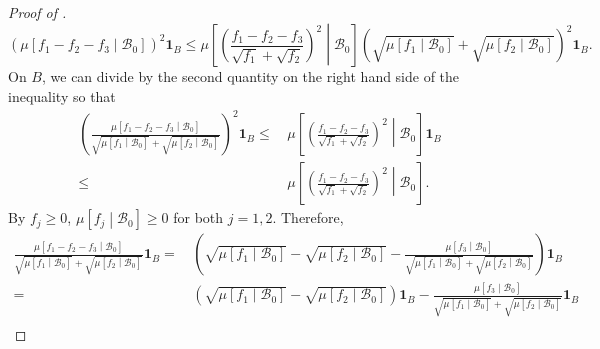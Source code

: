 \begin{proof}[Proof of ]
\begin{equation*}
  \left( \mu \left[ f_{1} - f_{2} - f_{3} \middle| \mathcal{B}_{0} \right]
  \right)^{2} \mathbf{1}_{B} \leq
  \mu \left[ \left( \frac{f_{1} - f_{2} - f_{3}}{\sqrt{f_{1}} +
  \sqrt{f_{2}}} \right)^{2} \middle| \mathcal{B}_{0} \right]
  \left( \sqrt{\mu \left[ f_{1} \middle| \mathcal{B}_{0} \right]} + \sqrt{\mu
  \left[ f_{2} \middle| \mathcal{B}_{0} \right]} \right)^{2} \mathbf{1}_{B}.
\end{equation*}
On \(B\), we can divide by the second quantity on the right hand side of the
inequality so that
\begin{equation*}
  \begin{split}
    \left( \frac{\mu \left[ f_{1} - f_{2} - f_{3} \middle| \mathcal{B}_{0}
    \right]}{\sqrt{\mu \left[ f_{1} \middle| \mathcal{B}_{0} \right]} +
    \sqrt{\mu \left[ f_{2} \middle| \mathcal{B}_{0} \right]}} \right)^{2}
    \mathbf{1}_{B} \leq
    & \, \mu \left[ \left( \frac{f_{1} - f_{2} - f_{3}}{\sqrt{f_{1}} +
    \sqrt{f_{2}}} \right)^{2} \middle| \mathcal{B}_{0} \right] \mathbf{1}_{B} \\
    \leq & \, \mu \left[ \left( \frac{f_{1} - f_{2} -
    f_{3}}{\sqrt{f_{1}} + \sqrt{f_{2}}} \right)^{2} \middle| \mathcal{B}_{0}
    \right].
  \end{split}
\end{equation*}
By \(f_{j} \geq 0\), \(\mu \left[ f_{j} \middle| \mathcal{B}_{0} \right] \geq
0\) for both \(j = 1, 2\).
Therefore,
\begin{equation*}
  \begin{split}
    \frac{\mu \left[ f_{1} - f_{2} - f_{3} \middle| \mathcal{B}_{0}
    \right]}{\sqrt{\mu \left[ f_{1} \middle| \mathcal{B}_{0} \right]} +
    \sqrt{\mu \left[ f_{2} \middle| \mathcal{B}_{0} \right]}}
    \mathbf{1}_{B} =
    & \, \left( \sqrt{\mu \left[ f_{1} \middle| \mathcal{B}_{0} \right]}
    - \sqrt{\mu \left[ f_{2} \middle| \mathcal{B}_{0} \right]} -
    \frac{\mu \left[ f_{3} \middle| \mathcal{B}_{0}
    \right]}{\sqrt{\mu \left[ f_{1} \middle| \mathcal{B}_{0} \right]} +
    \sqrt{\mu \left[ f_{2} \middle| \mathcal{B}_{0} \right]}} \right)
    \mathbf{1}_{B} \\
    =
    & \, \left( \sqrt{\mu \left[ f_{1} \middle| \mathcal{B}_{0} \right]}
    - \sqrt{\mu \left[ f_{2} \middle| \mathcal{B}_{0} \right]}  \right)
    \mathbf{1}_{B} - \frac{\mu \left[ f_{3} \middle| \mathcal{B}_{0}
    \right]}{\sqrt{\mu \left[ f_{1} \middle| \mathcal{B}_{0} \right]} +
    \sqrt{\mu \left[ f_{2} \middle| \mathcal{B}_{0} \right]}} \mathbf{1}_{B} \\

\end{split}
\end{equation*}
\end{proof}
